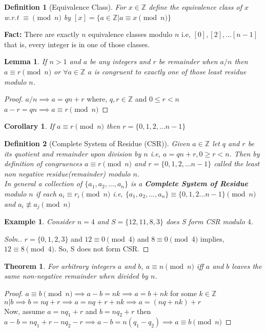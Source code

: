 \documentclass[12pt,a4paper]{article}
\newcommand{\Z}{\mathbb{Z}}
\newtheorem{thm}{Theorem}
\newtheorem{defn}{Definition}
\newtheorem{lem}{Lemma}
\newtheorem{cor}{Corollary}
\newtheorem{ex}{Example}
\begin{document}
\begin{defn}[Equivalence Class]\normalfont
	For $x \in \Z$ define the equivalence class of $x$ w.r.t $\equiv \pmod n$ by $[x]=\{a\in \Z | a\equiv x \pmod n \}$
\end{defn}
\textbf{Fact:} There are exactly $n$ equivalence classes modulo $n$ i.e, $[0],[2],\dots [n-1]$ that is, every integer is in one of those classes.
\begin{lem}	\normalfont
	If $n>1$ and $a$ be any integers and $r$ be remainder when $a/n$ then $a \equiv r \pmod n$ or $\forall a \in \Z$ $a$ is congruent to exactly one of those least residue modulo $n$.
\end{lem}
\begin{proof}
	$a/n \implies a=qn+r$ where, $ q,r \in \Z $ and $0\le r < n$ \\
	$a-r = qn \implies a \equiv r \pmod n$
\end{proof}

\begin{cor}\normalfont
	If $a \equiv r \pmod n$ then $r = \{0,1,2,\dots n-1\}$
\end{cor}

\begin{defn}[Complete System of Residue (CSR)]\normalfont
	Given $a \in \Z$ let $q$ and $r$ be its quotient and remainder upon division by $n$ i.e, $a = qn+r, 0 \ge r < n$. Then by definition of congruences $a \equiv r \pmod n$ and $r = \{0,1,2,\dots n-1\}$ called the least non negative residue(remainder) modulo $n$. \\
	In general a collection of $\{a_{1}, a_{2}, \dots, a_{n}\}$ is a \textbf{Complete System of Residue} modulo $n$ if each $a_{i} \equiv r_{i} \pmod n$ i.e, $\{a_{1}, a_{2}, \dots, a_{n}\} \equiv \{0,1,2 \dots n-1\} \pmod n$ and $a_{i} \not \equiv a_{j} \pmod n$
\end{defn}

\begin{ex}\normalfont
	Consider $n=4$ and $S = \{12,11,8,3\}$ does S form CSR modulo $4$.
\end{ex}
\begin{proof}[Soln.]
	$r = \{0,1,2,3\}$ and $12 \equiv 0 \pmod 4$ and $8 \equiv 0 \pmod 4$ implies, $12 \equiv 8 \pmod 4$. So, S does not form CSR.
\end{proof}

\begin{thm}\normalfont
	For arbitrary integers $a$ and $b$, $a \equiv n \pmod n$ iff $a$ and $b$ leaves the same non-negative remainder when divided by $n$. 
\end{thm}
\begin{proof}
	$ a \equiv b \pmod n \implies a - b = nk \implies a = b + nk$ for some $k \in \Z$\\
	$n|b \implies b = nq + r \implies a = nq+r+nk \implies a = (nq+nk)+r$\\
	Now, assume $a=nq_{1}+r$ and $b=nq_{2}+r$ then $a-b=nq_{1}+r - nq_{2}-r \implies a-b = n(q_{1}-q_{2}) \implies a\equiv b \pmod n$
\end{proof}
\end{document}
